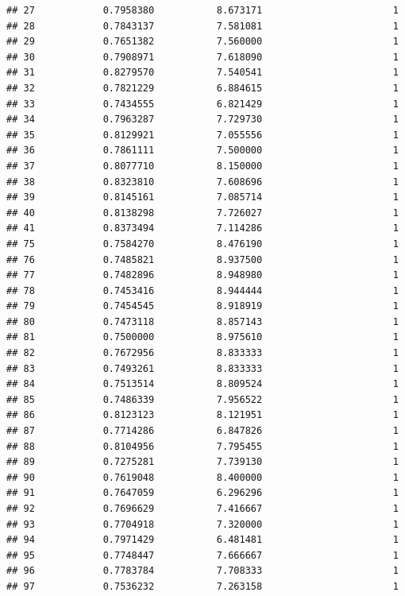 \documentclass[]{article}
\begin{document}
\begin{verbatim}
## 27            0.7958380           8.673171                       1
## 28            0.7843137           7.581081                       1
## 29            0.7651382           7.560000                       1
## 30            0.7908971           7.618090                       1
## 31            0.8279570           7.540541                       1
## 32            0.7821229           6.884615                       1
## 33            0.7434555           6.821429                       1
## 34            0.7963287           7.729730                       1
## 35            0.8129921           7.055556                       1
## 36            0.7861111           7.500000                       1
## 37            0.8077710           8.150000                       1
## 38            0.8323810           7.608696                       1
## 39            0.8145161           7.085714                       1
## 40            0.8138298           7.726027                       1
## 41            0.8373494           7.114286                       1
## 75            0.7584270           8.476190                       1
## 76            0.7485821           8.937500                       1
## 77            0.7482896           8.948980                       1
## 78            0.7453416           8.944444                       1
## 79            0.7454545           8.918919                       1
## 80            0.7473118           8.857143                       1
## 81            0.7500000           8.975610                       1
## 82            0.7672956           8.833333                       1
## 83            0.7493261           8.833333                       1
## 84            0.7513514           8.809524                       1
## 85            0.7486339           7.956522                       1
## 86            0.8123123           8.121951                       1
## 87            0.7714286           6.847826                       1
## 88            0.8104956           7.795455                       1
## 89            0.7275281           7.739130                       1
## 90            0.7619048           8.400000                       1
## 91            0.7647059           6.296296                       1
## 92            0.7696629           7.416667                       1
## 93            0.7704918           7.320000                       1
## 94            0.7971429           6.481481                       1
## 95            0.7748447           7.666667                       1
## 96            0.7783784           7.708333                       1
## 97            0.7536232           7.263158                       1

\end{verbatim}
\end{document}
